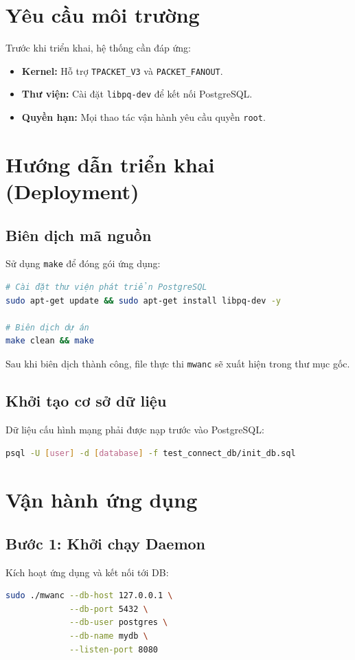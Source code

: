 \documentclass[12pt,a4paper]{article}
\begin{document}
\section{Yêu cầu môi trường}
Trước khi triển khai, hệ thống cần đáp ứng:
\begin{itemize}
    \item \textbf{Kernel:} Hỗ trợ \texttt{TPACKET\_V3} và \texttt{PACKET\_FANOUT}.
    \item \textbf{Thư viện:} Cài đặt \texttt{libpq-dev} để kết nối PostgreSQL.
    \item \textbf{Quyền hạn:} Mọi thao tác vận hành yêu cầu quyền \texttt{root}.
\end{itemize}

\section{Hướng dẫn triển khai (Deployment)}

\subsection{Biên dịch mã nguồn}
Sử dụng \texttt{make} để đóng gói ứng dụng:
\begin{lstlisting}[language=bash]
# Cài đặt thư viện phát triển PostgreSQL
sudo apt-get update && sudo apt-get install libpq-dev -y

# Biên dịch dự án
make clean && make
\end{lstlisting}
Sau khi biên dịch thành công, file thực thi \texttt{mwanc} sẽ xuất hiện trong thư mục gốc.

\subsection{Khởi tạo cơ sở dữ liệu}
Dữ liệu cấu hình mạng phải được nạp trước vào PostgreSQL:
\begin{lstlisting}[language=bash]
psql -U [user] -d [database] -f test_connect_db/init_db.sql
\end{lstlisting}

\section{Vận hành ứng dụng}

\subsection{Bước 1: Khởi chạy Daemon}
Kích hoạt ứng dụng và kết nối tới DB:
\begin{lstlisting}[language=bash]
sudo ./mwanc --db-host 127.0.0.1 \
             --db-port 5432 \
             --db-user postgres \
             --db-name mydb \
             --listen-port 8080
\end{lstlisting}
\end{document}
